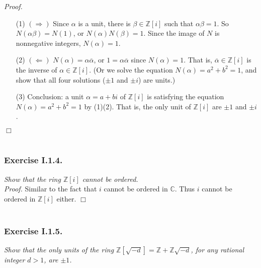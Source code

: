 \documentclass{article}
\begin{document}
\emph{Proof.}
\begin{enumerate}
\item[(1)]
  \emph{$(\Longrightarrow)$}
  Since $\alpha$ is a unit, there is $\beta \in \mathbb{Z}[i]$ such that
  $\alpha \beta = 1$.
  So $N(\alpha \beta) = N(1)$, or $N(\alpha) N(\beta) = 1$.
  Since the image of $N$ is nonnegative integers, $N(\alpha) = 1$.

\item[(2)]
  \emph{$(\Longleftarrow)$}
  $N(\alpha) = \alpha \overline{\alpha}$,
  or $1 = \alpha \overline{\alpha}$ since $N(\alpha) = 1$.
  That is, $\overline{\alpha} \in \mathbb{Z}[i]$ is
  the inverse of $\alpha \in \mathbb{Z}[i]$.
  (Or we solve the equation $N(\alpha) = a^2 + b^2 = 1$,
  and show that all four solutions ($\pm 1$ and $\pm i$) are units.)

\item[(3)]
  Conclusion: a unit $\alpha = a+bi$ of $\mathbb{Z}[i]$
  is satisfying the equation $N(\alpha) = a^2 + b^2 = 1$ by (1)(2).
  That is, the only unit of $\mathbb{Z}[i]$ are $\pm 1$ and $\pm i$.
\end{enumerate}
$\Box$ \\\\






\subsubsection*{Exercise I.1.4.}
\emph{Show that the ring $\mathbb{Z}[i]$ cannot be ordered.} \\



\emph{Proof.}
  Similar to the fact that $i$ cannot be ordered in $\mathbb{C}$.
  Thus $i$ cannot be ordered in $\mathbb{Z}[i]$ either.
$\Box$ \\\\






\subsubsection*{Exercise I.1.5.}
\emph{Show that the only units of the ring $\mathbb{Z}[\sqrt{-d}] = \mathbb{Z} + \mathbb{Z}\sqrt{-d}$,
for any rational integer $d > 1$, are $\pm 1$.} \\
\end{document}
